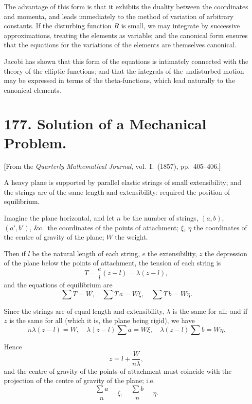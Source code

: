 \documentclass[11pt,a4paper]{article}
\theoremstyle{plain}
\begin{document}
The advantage of this form is that it exhibits the duality between the coordinates and momenta, and leads immediately to the method of variation of arbitrary constants. If the disturbing function $R$ is small, we may integrate by successive approximations, treating the elements as variable; and the canonical form ensures that the equations for the variations of the elements are themselves canonical.

Jacobi has shown that this form of the equations is intimately connected with the theory of the elliptic functions; and that the integrals of the undisturbed motion may be expressed in terms of the theta-functions, which lead naturally to the canonical elements.


\newpage
\section*{177. Solution of a Mechanical Problem.}

[From the \textit{Quarterly Mathematical Journal}, vol.~I.~(1857), pp.~405--406.]

A heavy plane is supported by parallel elastic strings of small extensibility; and the strings are of the same length and extensibility: required the position of equilibrium.

Imagine the plane horizontal, and let $n$ be the number of strings, $(a,b)$, $(a',b')$, \&c.\ the coordinates of the points of attachment; $\xi$, $\eta$ the coordinates of the centre of gravity of the plane; $W$ the weight.

Then if $l$ be the natural length of each string, $e$ the extensibility, $z$ the depression of the plane below the points of attachment, the tension of each string is
\[
T = \frac{e}{l}(z - l) = \lambda(z-l),
\]
and the equations of equilibrium are
\[
\sum T = W,\quad
\sum T\, a = W\xi,\quad
\sum T\, b = W\eta.
\]

Since the strings are of equal length and extensibility, $\lambda$ is the same for all; and if $z$ is the same for all (which it is, the plane being rigid), we have
\[
n\lambda(z-l) = W,\quad
\lambda(z-l)\sum a = W\xi,\quad
\lambda(z-l)\sum b = W\eta.
\]

Hence
\[
z = l + \frac{W}{n\lambda},
\]
and the centre of gravity of the points of attachment must coincide with the projection of the centre of gravity of the plane; i.e.
\[
\frac{\sum a}{n} = \xi,\quad \frac{\sum b}{n} = \eta.
\]
\end{document}
